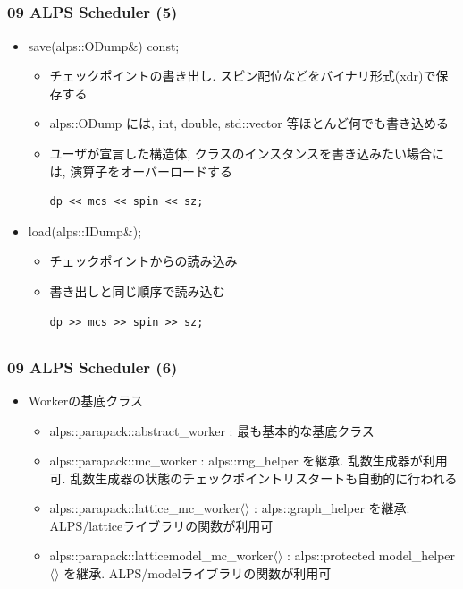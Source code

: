 \subsection*{\redm\whitem\greenb}
\begin{frame}[fragile]
  \frametitle{09 ALPS Scheduler (5)}
  \begin{itemize}
    \item save(alps::ODump\&) const;
      \begin{itemize}
        \item チェックポイントの書き出し. スピン配位などをバイナリ形式(xdr)で保存する
        \item alps::ODump には, int, double, std::vector 等ほとんど何でも書き込める
        \item ユーザが宣言した構造体, クラスのインスタンスを書き込みたい場合には, 演算子をオーバーロードする
\begin{lstlisting}
dp << mcs << spin << sz;
\end{lstlisting}
      \end{itemize}
    \item load(alps::IDump\&);
      \begin{itemize}
        \item チェックポイントからの読み込み
        \item 書き出しと同じ順序で読み込む
\begin{lstlisting}
dp >> mcs >> spin >> sz;
\end{lstlisting}
      \end{itemize}
  \end{itemize}
\end{frame}

\subsection*{\redm\whitem\greenb}
\begin{frame}[fragile]
  \frametitle{09 ALPS Scheduler (6)}
  \begin{itemize}
    \item Workerの基底クラス
      \begin{itemize}
      \item alps::parapack::abstract\_worker : 最も基本的な基底クラス
      \item alps::parapack::mc\_worker : alps::rng\_helper を継承. 乱数生成器が利用可. 乱数生成器の状態のチェックポイントリスタートも自動的に行われる
      \item alps::parapack::lattice\_mc\_worker$\langle\rangle$ : alps::graph\_helper を継承. ALPS/latticeライブラリの関数が利用可
      \item alps::parapack::latticemodel\_mc\_worker$\langle\rangle$ : alps::protected model\_helper$\langle\rangle$ を継承. ALPS/modelライブラリの関数が利用可
      \end{itemize}
  \end{itemize}
\end{frame}

